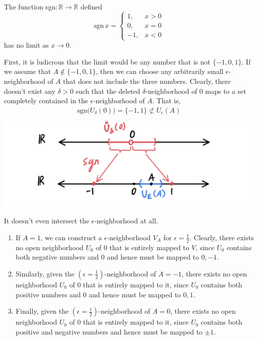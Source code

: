\documentclass{article}
\begin{document}
    \begin{example}
      The function sgn$: \mathbb{R} \longrightarrow \mathbb{R}$ defined
      \[\text{sgn}\,x = \begin{cases}
      1, & x > 0 \\
      0, & x = 0 \\
      -1, & x < 0
      \end{cases}\]
      has no limit as $x \rightarrow 0$. 

      First, it is ludicrous that the limit would be any number that is not $\{-1, 0, 1\}$. If we assume that $A \not\in \{-1,0,1\}$, then we can choose any arbitrarily small $\epsilon$-neighborhood of $A$ that does not include the three numbers. Clearly, there doesn't exist any $\delta>0$ such that the deleted $\delta$-neighborhood of $0$ maps to a set completely contained in the $\epsilon$-neighborhood of $A$. That is,
      \[\text{sgn}\big( \mathring{U}_\delta (0)\big) = \{-1,1\} \not\subset U_\epsilon (A)\]
      \begin{center}
          \includegraphics[scale=0.3]{img/Limit_of_Sign_Function_Ludicrous.PNG}
      \end{center}
      It doesn't even intersect the $\epsilon$-neighborhood at all. 
      \begin{enumerate}
        \item If $A = 1$, we can construct a $\epsilon$-neighborhood $V_A$ for $\epsilon = \frac{1}{2}$. Clearly, there exists no open neighborhood $U_0$ of $0$ that is entirely mapped to $V$, since $U_0$ contains both negative numbers and $0$ and hence must be mapped to $0, -1$. 
        \item Similarly, given the $(\epsilon=\frac{1}{2})$-neighborhood of $A = -1$, there exists no open neighborhood $U_0$ of $0$ that is entirely mapped to it, since $U_0$ contains both positive numbers and $0$ and hence must be mapped to $0, 1$. 
        \item Finally, given the $(\epsilon=\frac{1}{2})$-neighborhood of $A = 0$, there exists no open neighborhood $U_0$ of $0$ that is entirely mapped to it, since $U_0$ contains both positive and negative numbers and hence must be mapped to $\pm1$. 

\end{enumerate}
\end{example}
\end{document}

